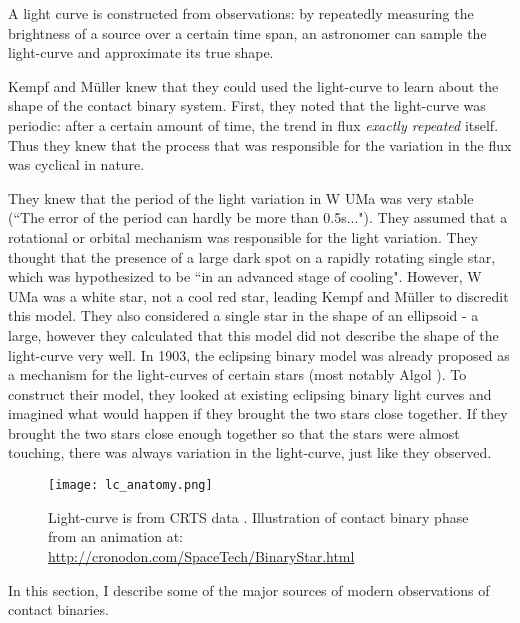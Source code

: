 \documentclass[12pt]{article} %
\numberwithin{equation}{section} %
\begin{document}
A light curve is constructed from observations: by repeatedly measuring the brightness of a source over a certain time span, an astronomer can sample the light-curve and approximate its true shape.

Kempf and M\"{u}ller knew that they could used the light-curve to learn about the shape of the contact binary system. First, they noted that the light-curve was periodic: after a certain amount of time, the trend in flux \emph{exactly repeated} itself. Thus they knew that the process that was responsible for the variation in the flux was cyclical in nature. 

They knew that the period of the light variation in W UMa was very stable (``The error of the period can hardly be more than 0.5s..."). They assumed that a rotational or orbital mechanism was responsible for the light variation. They thought that the presence of a large dark spot on a rapidly rotating single star, which was hypothesized to be ``in an advanced stage of cooling". However, W UMa was a white star, not a cool red star, leading Kempf and M\"{u}ller to discredit this model. They also considered a single star in the shape of an ellipsoid - a large, however they calculated that this model did not describe the shape of the light-curve very well. In 1903, the eclipsing binary model was already proposed as a mechanism for the light-curves of certain stars (most notably Algol ). To construct their model, they looked at existing eclipsing binary light curves and imagined what would happen if they brought the two stars close together. If they brought the two stars close enough together so that the stars were almost touching, there was always variation in the light-curve, just like they observed.

\begin{figure}[H]
\centering
\texttt{[image: lc\_anatomy.png]}
\caption{Light-curve is from CRTS data \citep{drake2014catalina}. Illustration of contact binary phase from an animation at: \url{http://cronodon.com/SpaceTech/BinaryStar.html}}
\label{fig: lc_anatomy}
\end{figure}


In this section, I describe some of the major sources of modern observations of contact binaries. 
\end{document}
